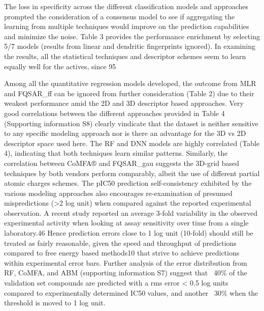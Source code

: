 The loss in specificity across the different classification models and approaches prompted the consideration of a consensus model to see if aggregating the learning from multiple techniques would improve on the prediction capabilities and minimize the noise.  Table 3 provides the performance enrichment by selecting 5/7 models (results from linear and dendritic fingerprints ignored).  In examining the results, all the statistical techniques and descriptor schemes seem to learn equally well for the actives, since 95%

Among all the quantitative regression models developed, the outcome from MLR and FQSAR\_ff can be ignored from further consideration (Table 2) due to their weakest performance amid the 2D and 3D descriptor based approaches.  Very good correlations between the different approaches provided in Table 4 (Supporting information S8) clearly vindicate that the dataset is neither sensitive to any specific modeling approach nor is there an advantage for the 3D vs 2D descriptor space used here.  The RF and DNN models are highly correlated (Table 4), indicating that both techniques learn similar patterns.  Similarly, the correlation between CoMFA® and FQSAR\_gau suggests the 3D-grid based techniques by both vendors perform comparably, albeit the use of different partial atomic charges schemes.  The pIC50 prediction self-consistency exhibited by the various modeling approaches also encourages re-examination of presumed mispredictions (>2 log unit) when compared against the reported experimental observation.  A recent study reported an average 3-fold variability in the observed experimental activity when looking at assay sensitivity over time from a single laboratory.46  Hence prediction errors close to 1 log unit (10-fold) should still be treated as fairly reasonable, given the speed and throughput of predictions compared to free energy based methods10 that strive to achieve predictions within experimental error bars.  Further analysis of the error distribution from RF, CoMFA, and ABM (supporting information S7) suggest that ~40\% of the validation set compounds are predicted with a rms error < 0.5 log units compared to experimentally determined IC50 values, and another ~30\% when the threshold is moved to 1 log unit.  

